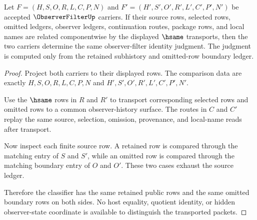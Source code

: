 \begin{theorem}
\label{thm:observer-filter-identity-stability}
Let $F=(H,S,O,R,L,C,P,N)$ and $F'=(H',S',O',R',L',C',P',N')$ be accepted $\ObserverFilterUp$ carriers. If their source rows, selected rows, omitted ledgers, observer ledgers, continuation routes, package rows, and local names are related componentwise by the displayed $\hsame$ transports, then the two carriers determine the same observer-filter identity judgment. The judgment is computed only from the retained subhistory and omitted-row boundary ledger.
\end{theorem}
\begin{proof}
Project both carriers to their displayed rows. The comparison data are exactly $H,S,O,R,L,C,P,N$ and $H',S',O',R',L',C',P',N'$.

Use the $\hsame$ rows in $R$ and $R'$ to transport corresponding selected rows and omitted rows to a common observer-history surface. The routes in $C$ and $C'$ replay the same source, selection, omission, provenance, and local-name reads after transport.

Now inspect each finite source row. A retained row is compared through the matching entry of $S$ and $S'$, while an omitted row is compared through the matching boundary entry of $O$ and $O'$. These two cases exhaust the source ledger.

Therefore the classifier has the same retained public rows and the same omitted boundary rows on both sides. No host equality, quotient identity, or hidden observer-state coordinate is available to distinguish the transported packets.
\end{proof}

